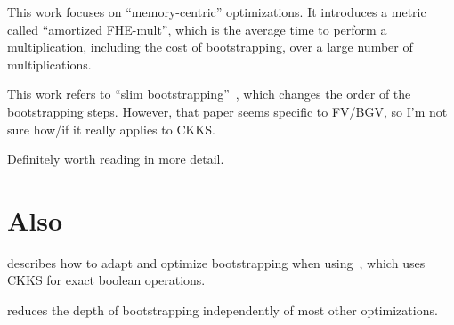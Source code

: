 \documentclass[../fheimpl.tex]{subfiles}
\begin{document}
    This work focuses on ``memory-centric'' optimizations. It introduces a metric called ``amortized FHE-mult'', which is the average time to perform a multiplication, including the cost of bootstrapping, over a large number of multiplications.
    
    This work refers to ``slim bootstrapping''~\cite{cryptoeprint:2018/067}, which changes the order of the bootstrapping steps. However, that paper seems specific to FV/BGV, so I'm not sure how/if it really applies to CKKS.
	
    Definitely worth reading in more detail.
    

    \section{Also}
    \cite{cryptoeprint:2024/767} describes how to adapt and optimize bootstrapping when using~\cite{cryptoeprint:2022/1298}, which uses CKKS for exact boolean operations.
    
    \cite{cryptoeprint:2025/1403} reduces the depth of bootstrapping independently of most other optimizations.

    \ifcompileasbook
    \else
        \printbibliography
    \fi
\end{document}
